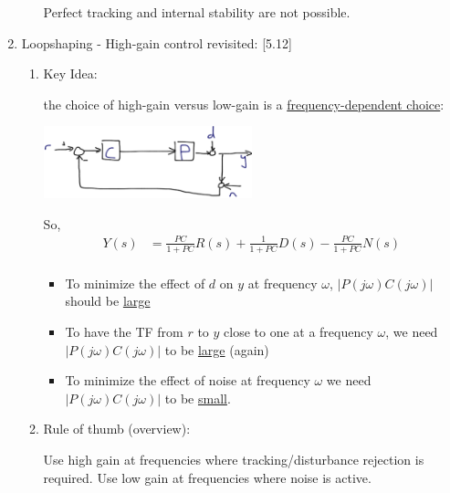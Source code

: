 \begin{enumerate}
\begin{enumerate}
                    Perfect tracking and internal stability are not possible.
            \end{enumerate}

    \item Loopshaping - High-gain control revisited: [5.12]
        \begin{enumerate}
            \item Key Idea:

                the choice of high-gain versus low-gain is a \uline{frequency-dependent choice}:

                \begin{center}\includegraphics[width=0.5\textwidth,keepaspectratio]{images/5-13-a.png}\end{center}

                So,
                \begin{align*}
                    Y(s) &= \frac{PC}{1+PC} R(s)  + \frac{1}{1+PC}D(s) - \frac{PC}{1+PC} N(s) \\
                \end{align*}
                \begin{itemize}
                    \item To minimize the effect of $d$ on $y$ at frequency $\omega$, $|P(j\omega) C(j\omega)|$ should be \uline{large}
                    \item To have the TF from $r$ to $y$ close to one at a frequency $\omega$, we need $|P(j\omega) C(j\omega)|$ to be \uline{large} (again)
                    \item To minimize the effect of noise at frequency $\omega$ we need $|P(j\omega) C(j\omega)|$ to be \uline{small}.
                \end{itemize}

            \item Rule of thumb (overview):

                Use high gain at frequencies where tracking/disturbance rejection is required. Use low gain at frequencies where noise is active.


\end{enumerate}
\end{enumerate}
